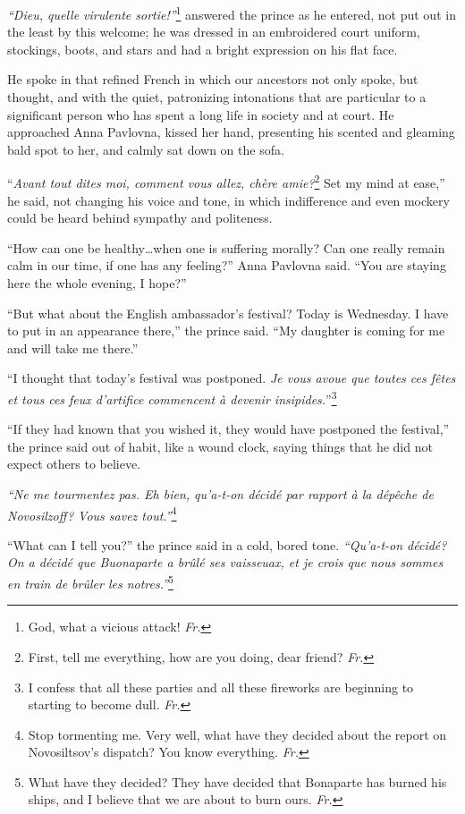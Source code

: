 \textit{``Dieu, quelle virulente sortie!''}\footnote{God, what a
  vicious attack! \textit{Fr.}} answered the prince as he entered, not
put out in the least by this welcome; he was dressed in an embroidered
court uniform, stockings, boots, and stars and had a bright expression
on his flat face.

He spoke in that refined French in which our ancestors not only spoke,
but thought, and with the quiet, patronizing intonations that are
particular to a significant person who has spent a long life in
society and at court. He approached Anna Pavlovna, kissed her hand,
presenting his scented and gleaming bald spot to her, and calmly sat
down on the sofa.

``\textit{Avant tout dites moi, comment vous allez, ch\`ere
  amie?}\footnote{First, tell me everything, how are you doing, dear
  friend? \textit{Fr.}} Set my mind at ease,'' he said, not changing
his voice and tone, in which indifference and even mockery could be
heard behind sympathy and politeness. %

``How can one be healthy\ldots{}when one is suffering morally? Can one
really remain calm in our time, if one has any feeling?'' Anna
Pavlovna said. ``You are staying here the whole evening, I hope?''

``But what about the English ambassador's festival? Today is
Wednesday. I have to put in an appearance there,'' the prince
said. ``My daughter is coming for me and will take me there.'' %

``I thought that today's festival was postponed. \textit{Je vous avoue
  que toutes ces f\^etes et tous ces feux d'artifice commencent \`a
  devenir insipides.}''\footnote{I confess that all these parties and
  all these fireworks are beginning to starting to become
  dull. \textit{Fr.}} %

``If they had known that you wished it, they would have postponed the
festival,'' the prince said out of habit, like a wound clock, saying
things that he did not expect others to believe. %

\textit{``Ne me tourmentez pas. Eh bien, qu'a-t-on d\'ecid\'e par
  rapport \`a la d\'ep\^eche de Novosilzoff? Vous savez
  tout.''}\footnote{Stop tormenting me. Very well, what have they
  decided about the report on Novosiltsov's dispatch? You know
  everything. \textit{Fr.}} %

``What can I tell you?'' the prince said in a cold, bored
tone. \textit{``Qu'a-t-on d\'ecid\'e? On a d\'ecid\'e que Buonaparte a
  br\^ul\'e ses vaisseuax, et je crois que nous sommes en train de
  br\^uler les notres.''}\footnote{What have they decided? They have
  decided that Bonaparte has burned his ships, and I believe that we
  are about to burn ours. \textit{Fr.}} %

